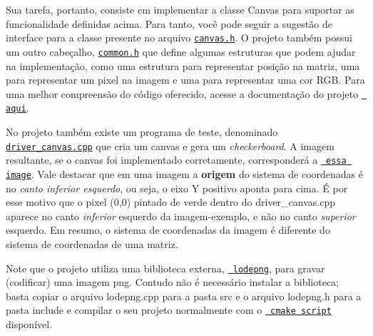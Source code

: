 Sua tarefa, portanto, consiste em implementar a classe {\ttfamily Canvas} para suportar as funcionalidade definidas acima. Para tanto, você pode seguir a sugestão de interface para a classe presente no arquivo \href{include/canvas.h}{\texttt{ {\ttfamily canvas.\+h}}}. O projeto também possui um outro cabeçalho, \href{include/common.h}{\texttt{ {\ttfamily common.\+h}}} que define algumas estruturas que podem ajudar na implementação, como uma estrutura para representar posição na matriz, uma para representar um pixel na imagem e uma para representar uma cor R\+GB. Para uma melhor compreensão do código oferecido, acesse a documentação do projeto \href{docs/html/index.html}{\texttt{ aqui}}.

No projeto também existe um programa de teste, denominado \href{src/driver_canvas.cpp}{\texttt{ {\ttfamily driver\+\_\+canvas.\+cpp}}} que cria um canvas e gera um {\itshape checkerboard}. A imagem resultante, se o canvas foi implementado corretamente, corresponderá a \href{build/test.png}{\texttt{ essa image}}. Vale destacar que em uma imagem a {\bfseries{origem}} do sistema de coordenadas é no {\itshape canto inferior esquerdo}, ou seja, o eixo Y positivo aponta para cima. É por esse motivo que o pixel {\ttfamily (0,0)} pintado de verde dentro do {\ttfamily driver\+\_\+canvas.\+cpp} aparece no canto {\itshape inferior} esquerdo da imagem-\/exemplo, e não no canto {\itshape superior} esquerdo. Em resumo, o sistema de coordenadas da imagem é diferente do sistema de coordenadas de uma matriz.

Note que o projeto utiliza uma biblioteca externa, \href{https://github.com/lvandeve/lodepng/blob/master/examples/example_encode.cpp}{\texttt{ lodepng}}, para gravar (codificar) uma imagem png. Contudo não é necessário instalar a biblioteca; basta copiar o arquivo {\ttfamily lodepng.\+cpp} para a pasta {\ttfamily src} e o arquivo {\ttfamily lodepng.\+h} para a pasta {\ttfamily include} e compilar o seu projeto normalmente com o \href{CMakeLists.txt}{\texttt{ cmake script}} disponível. 